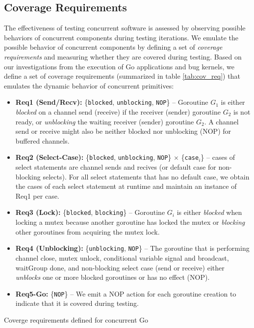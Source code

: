 \subsection{Coverage Requirements}
\label{sec:covreq}
The effectiveness of testing concurrent software is assessed by observing possible behaviors of concurrent components during testing iterations.
%
We emulate the possible behavior of concurrent components by defining a set of \textit{coverage requirements} and measuring whether they are covered during testing.
%
Based on our investigations from the execution of Go applications and bug kernels, we define a set of coverage requirements (summarized in table \ref{tab:cov_req}) that emulates the dynamic behavior of concurrent primitives:
%
\begin{itemize}
  \item \textbf{Req1 (Send/Recv):} \{\texttt{blocked}, \texttt{unblocking}, \texttt{NOP}\} -- Goroutine $G_1$ is either \textit{blocked} on a channel send (receive) if the receiver (sender) goroutine $G_2$ is not ready, or \textit{unblocking} the waiting receiver (sender) goroutine $G_2$. A channel send or receive might also be neither blocked nor unblocking (NOP) for buffered channels.
  \item \textbf{Req2 (Select-Case):} \{\texttt{blocked}, \texttt{unblocking}, \texttt{NOP}\} $\times$ \{\texttt{case}$_i$\} -- cases of select statements are channel sends and recives (or default case for non-blocking selects). For all select statements that has no default case, we obtain the cases of each select statement at runtime and maintain an instance of Req1 per case.
  \item \textbf{Req3 (Lock):} \{\texttt{blocked}, \texttt{blocking}\} -- Goroutine $G_i$ is either \textit{blocked} when locking a mutex because another goroutine has locked the mutex or \textit{blocking} other goroutines from acquiring the mutex lock.
  \item \textbf{Req4 (Unblocking):} \{\texttt{unblocking}, \texttt{NOP}\} -- The goroutine that is performing channel close, mutex unlock, conditional variable signal and broadcast, waitGroup done, and non-blocking select case (send or receive) either \textit{unblocks} one or more blocked goroutines or has no effect (NOP).
  \item \textbf{Req5-Go:} \{\texttt{NOP}\} -- We emit a NOP action for each goroutine creation to indicate that it is covered during testing.
\end{itemize}


\begin{table}[]
\centering
\caption{Coverge requirements defined for concurrent Go}
\scalebox{0.83}{

}
\label{tab:cov_req}
\end{table}


